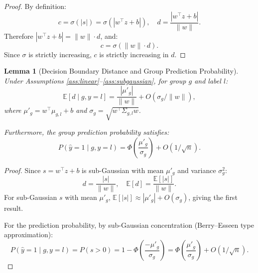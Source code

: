 \documentclass[11pt]{article}
\newtheorem{lemma}[theorem]{Lemma}
\begin{document}
\begin{proof}
    By definition:
    \begin{equation}
        c = \sigma(|s|) = \sigma(|w^\top z + b|), \quad d = \frac{|w^\top z + b|}{\|w\|}.
    \end{equation}
    Therefore $|w^\top z + b| = \|w\| \cdot d$, and:
    \begin{equation}
        c = \sigma(\|w\| \cdot d).
    \end{equation}
    Since $\sigma$ is strictly increasing, $c$ is strictly increasing in $d$.
\end{proof}

\begin{lemma}[Decision Boundary Distance and Group Prediction Probability]
    \label{lem:dist_prob}
    Under Assumptions \ref{ass:linear}--\ref{ass:subgaussian}, for group $g$ and label $l$:
    \begin{equation}
        \mathbb{E}[d \mid g, y=l] = \frac{|\mu'_g|}{\|w\|} + O(\sigma_g / \|w\|),
    \end{equation}
    where $\mu'_g = w^\top \mu_{g,l} + b$ and $\sigma_g = \sqrt{w^\top \Sigma_{g,l} w}$.

    Furthermore, the group prediction probability satisfies:
    \begin{equation}
        P(\hat{y}=1 \mid g, y=l) = \Phi\!\left(\frac{\mu'_g}{\sigma_g}\right) + O(1/\sqrt{n}).
    \end{equation}
\end{lemma}

\begin{proof}
    Since $s = w^\top z + b$ is sub-Gaussian with mean $\mu'_g$ and variance $\sigma_g^2$:
    \begin{equation}
        d = \frac{|s|}{\|w\|}, \quad \mathbb{E}[d] = \frac{\mathbb{E}[|s|]}{\|w\|}.
    \end{equation}
    For sub-Gaussian $s$ with mean $\mu'_g$, $\mathbb{E}[|s|] \approx |\mu'_g| + O(\sigma_g)$, giving the first result.

    For the prediction probability, by sub-Gaussian concentration (Berry--Esseen type approximation):
    \begin{equation}
        P(\hat{y}=1 \mid g, y=l) = P(s > 0) = 1 - \Phi\!\left(\frac{-\mu'_g}{\sigma_g}\right) = \Phi\!\left(\frac{\mu'_g}{\sigma_g}\right) + O(1/\sqrt{n}).
    \end{equation}
\end{proof}
\end{document}
